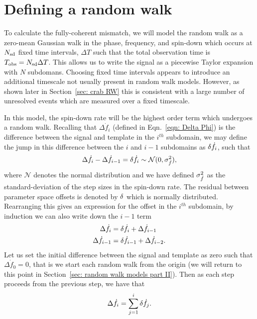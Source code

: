 \documentclass[../full_thesis/full_thesis.tex]{subfiles}
\begin{document}
\section{Defining a random walk}
\label{sec: Defining a random walk}
To calculate the fully-coherent mismatch, we will model the random walk as a
zero-mean Gaussian walk in the phase, frequency, and spin-down which occurs at
$N_{\textrm{sd}}$ fixed time intervals, $\Delta T$ such that the total observation time is
$T_{\mathrm{obs}} = N_{\textrm{sd}} \Delta T$.
This allows us to write the signal as 
a piecewise Taylor expansion with $N$ subdomans. Choosing fixed time intervals appears to
introduce an additional timescale not usually present in random walk models.
However, as shown later in Section~\ref{sec: crab RW} this is consistent with a
large number of unresolved events which
are measured over a fixed timescale.

In this model, the spin-down rate will be the highest order term which
undergoes a random walk. Recalling that $\Delta \dot{f}_i$ (defined in
Eqn.~\eqref{eqn: Delta Phi}) is the difference between the signal and template
in the $i^{th}$ subdomain, we may define the jump in this difference between
the $i$ and $i-1$ subdomains as $\delta \dot{f}_i$, such that
\begin{equation}
\Delta \dot{f}_{i} - \Delta\dot{f}_{i-1} = \delta \dot{f}_{i} \sim \mathcal{N}(0, \sigma_{\dot{f}}^{2}),
\end{equation}
where $\mathcal{N}$ denotes the normal distribution and we have defined $\sigma_{\dot{f}}^{2}$
as the standard-deviation of the step sizes in the spin-down rate. The residual
between parameter space offsets is denoted by $\delta$ which is normally
distributed. Rearranging this gives an expression for the offset in the
$i^{th}$ subdomain, by induction we can also write down the $i-1$ term
\begin{align}
\Delta\dot{f}_{i} &  = \delta\dot{f}_{i} + \Delta\dot{f}_{i-1}  \\
\Delta\dot{f}_{i-1} &  = \delta\dot{f}_{i-1} + \Delta\dot{f}_{i-2}  .
\end{align}
Let us set the initial difference between the signal and template as zero such
that $\Delta\dot{f}_0=0$, that is we start each random walk from the origin
(we will return to this point in Section~\ref{sec: random walk models part
II}). Then as each step proceeds from the previous step, we have that
\begin{equation} 
\Delta\dot{f}_{i} = \sum_{j=1}^{i}\delta\dot{f}_{j}.
\label{eqn: delta fdot n} 
\end{equation}
\end{document}
